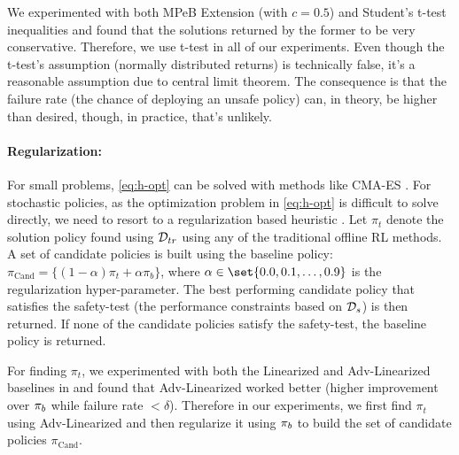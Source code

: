 We experimented with both MPeB Extension (with $c=0.5$) and Student's t-test inequalities and found that the solutions returned by the former to be very conservative. Therefore, we use t-test in all of our experiments. Even though the t-test's assumption (normally distributed returns) is technically false, it's a reasonable assumption due to central limit theorem. 
The consequence is that the failure rate (the chance of deploying an unsafe policy) can, in theory, be higher than desired, though, in practice, that's unlikely.


\paragraph{Regularization:} 
For small problems, \ref{eq:h-opt} can be solved with methods like CMA-ES \citep{hansen2006cma}. 
% 
For stochastic policies, 
as the optimization problem in \ref{eq:h-opt} is difficult to solve directly, we need to resort to a regularization based heuristic \citep{thomas2015highImprovement, laroche2017safe}. Let $\pi_t$ denote the solution policy found using $\mathcal{D}_{tr}$ using any of the traditional offline RL methods. A set of candidate policies is built using the baseline policy: $\pi_{\text{Cand}} = \{ (1-\alpha)\pi_t + \alpha \pi_b\}$, where $\alpha \in \set{0.0, 0.1, \dots, 0.9}$ is the regularization hyper-parameter. 
The best performing candidate policy that satisfies the safety-test (the performance constraints based on $\mathcal{D}_s$) is then returned.
If none of the candidate policies satisfy the safety-test, the baseline policy is returned.

For finding $\pi_t$, we experimented with both the Linearized and Adv-Linearized baselines in  and found that Adv-Linearized worked better (higher improvement over $\pi_{b}$ while failure rate $<\delta$). Therefore in our experiments, we first find $\pi_t$ using Adv-Linearized and then regularize it using $\pi_{b}$ to build the set of candidate policies $\pi_{\text{Cand}}$. 


